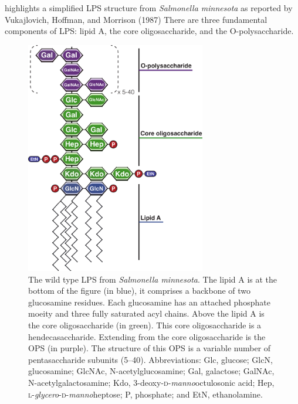  highlights a simplified \ac{LPS} structure from
\textit{Salmonella minnesota} as reported by Vukajlovich, Hoffman, and Morrison (1987)  There are three fundamental components of \ac{LPS}: lipid A, the core oligosaccharide, and the O-polysaccharide. 
\begin{figure}[p]
  	\begin{center}
   		\includegraphics[width=0.7\textwidth]{intro/img/lpsoverview.pdf}
   	\end{center}
   	\caption[Simplified structure of \ac{LPS} from \textit{Salmonella minnesota}]{
The wild type \ac{LPS} from \textit{Salmonella minnesota}. The lipid A is at the
bottom of the figure (in blue), it comprises a backbone of two glucosamine residues. Each
glucosamine has an attached phosphate moeity and  three fully saturated acyl
chains. Above the lipid A is the core oligosaccharide (in green). This core
oligosaccharide is a hendecasaccharide. Extending from the core oligosaccharide
is the \ac{OPS} (in purple). The structure of this \ac{OPS} is a variable number of
pentasaccharide subunits (5--40). Abbreviations: Glc, glucose; GlcN, glucosamine; GlcNAc,
N-acetylglucosamine; Gal, galactose;  GalNAc, N-acetylgalactosamine; Kdo,
3-deoxy-\textsc{d}-\textit{manno}octulosonic acid; Hep,
\textsc{l}-\textit{glycero}-\textsc{d}-\textit{manno}heptose; P, phosphate; and
EtN, ethanolamine.
}
   	\label{fig:lpsoverview}
\end{figure}   

